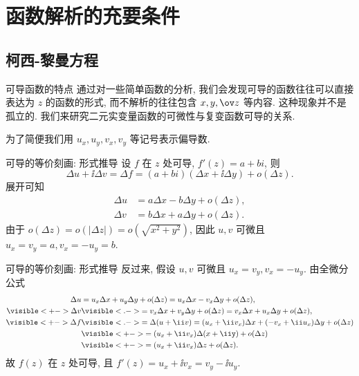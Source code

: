 \section{函数解析的充要条件}

\subsection{柯西-黎曼方程}
\begin{frame}{可导函数的特点}
	\onslide<+->
	通过对一些简单函数的分析, 我们会发现可导的函数往往可以直接表达为 $z$ 的函数的形式, 而不解析的往往包含 $x,y,\ov z$ 等内容.
	\onslide<+->
	这种现象并不是孤立的.
	\onslide<+->
	我们来研究二元实变量函数的可微性与复变函数可导的关系.

	\onslide<+->
	为了简便我们用 $u_x,u_y,v_x,v_y$ 等记号表示偏导数.
\end{frame}


\begin{frame}{可导的等价刻画: 形式推导}
	\onslide<+->
	设 \alert{$f$ 在 $z$ 处可导}, $f'(z)=a+bi$,
	\onslide<+->
	则
	\[\Delta u+\ii\Delta v=\Delta f=(a+bi)(\Delta x+\ii\Delta y)+o(\Delta z).
	\]
	\onslide<+->展开可知
	\begin{align*}
		\Delta u&=a\Delta x-b\Delta y+o(\Delta z),\\
		\Delta v&=b\Delta x+a\Delta y+o(\Delta z).
	\end{align*}
	\onslide<+->
	由于 $o(\Delta z)=o(|\Delta z|)=o(\sqrt{x^2+y^2})$,
	\onslide<+->
	因此 \alert{$u,v$ 可微且 $u_x=v_y=a,v_x=-u_y=b$}.
\end{frame}


\begin{frame}{可导的等价刻画: 形式推导}
	\onslide<+->
	反过来, 假设 \alert{$u,v$ 可微且 $u_x=v_y, v_x=-u_y$}.
	\onslide<+->
	由全微分公式
	\begin{align*}
		\Delta u&=u_x\Delta x+u_y\Delta y+o(\Delta z)
			=u_x\Delta x-v_x\Delta y+o(\Delta z),\\
			\visible<+->{\Delta v}&\visible<.->{=v_x\Delta x+v_y\Delta y+o(\Delta z)
			=v_x\Delta x+u_x\Delta y+o(\Delta z),}\\
		\visible<+->{\Delta f}&
		\visible<.->{=\Delta (u+\ii v)=(u_x+\ii v_x)\Delta x+(-v_x+\ii u_x)\Delta y}+o(\Delta z)\\
		&\visible<+->{=(u_x+\ii v_x)\Delta(x+\iiy)+o(\Delta z)}\\
		&\visible<+->{=(u_x+\ii v_x)\Delta z+o(\Delta z).}
	\end{align*}
	\onslide<+->
	故 \alert{$f(z)$ 在 $z$ 处可导, 且 $f'(z)=u_x+\ii v_x=v_y-\ii  u_y$}.
\end{frame}


